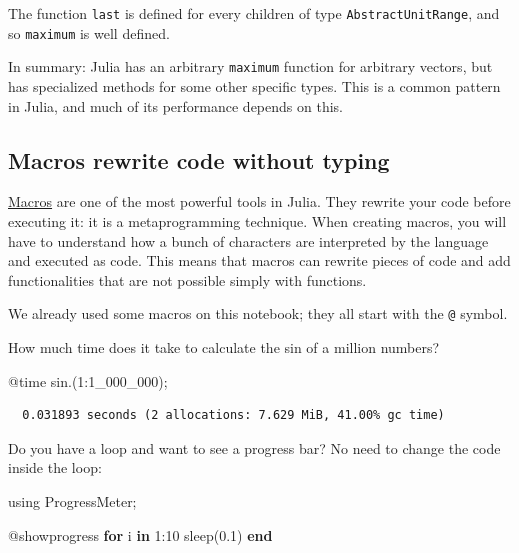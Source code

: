 \documentclass[
  letterpaper,
  DIV=11,
  numbers=noendperiod]{scrartcl}
\newenvironment{Shaded}{\begin{snugshade}}{\end{snugshade}}
\newcommand{\BuiltInTok}[1]{\textcolor[rgb]{0.00,0.23,0.31}{#1}}
\newcommand{\ControlFlowTok}[1]{\textcolor[rgb]{0.00,0.23,0.31}{\textbf{#1}}}
\newcommand{\FloatTok}[1]{\textcolor[rgb]{0.68,0.00,0.00}{#1}}
\newcommand{\FunctionTok}[1]{\textcolor[rgb]{0.28,0.35,0.67}{#1}}
\newcommand{\ImportTok}[1]{\textcolor[rgb]{0.00,0.46,0.62}{#1}}
\newcommand{\KeywordTok}[1]{\textcolor[rgb]{0.00,0.23,0.31}{\textbf{#1}}}
\newcommand{\NormalTok}[1]{\textcolor[rgb]{0.00,0.23,0.31}{#1}}
\newcommand{\OperatorTok}[1]{\textcolor[rgb]{0.37,0.37,0.37}{#1}}
\newcommand{\PreprocessorTok}[1]{\textcolor[rgb]{0.68,0.00,0.00}{#1}}
\begin{document}
The function \texttt{last} is defined for every children of type
\texttt{AbstractUnitRange}, and so \texttt{maximum} is well defined.

In summary: Julia has an arbitrary \texttt{maximum} function for
arbitrary vectors, but has specialized methods for some other specific
types. This is a common pattern in Julia, and much of its performance
depends on this.

\subsection{Macros rewrite code without
typing}\label{macros-rewrite-code-without-typing}

\href{https://docs.julialang.org/en/v1/manual/metaprogramming/}{Macros}
are one of the most powerful tools in Julia. They rewrite your code
before executing it: it is a metaprogramming technique. When creating
macros, you will have to understand how a bunch of characters are
interpreted by the language and executed as code. This means that macros
can rewrite pieces of code and add functionalities that are not possible
simply with functions.

We already used some macros on this notebook; they all start with the
\texttt{@} symbol.

How much time does it take to calculate the sin of a million numbers?

\begin{Shaded}
\begin{Highlighting}[]
\PreprocessorTok{@time} \FunctionTok{sin}\NormalTok{.(}\FloatTok{1}\OperatorTok{:}\FloatTok{1\_000\_000}\NormalTok{);}
\end{Highlighting}
\end{Shaded}

\begin{verbatim}
  0.031893 seconds (2 allocations: 7.629 MiB, 41.00% gc time)
\end{verbatim}

Do you have a loop and want to see a progress bar? No need to change the
code inside the loop:

\begin{Shaded}
\begin{Highlighting}[]
\ImportTok{using} \BuiltInTok{ProgressMeter;}

\PreprocessorTok{@showprogress} \ControlFlowTok{for}\NormalTok{ i }\KeywordTok{in} \FloatTok{1}\OperatorTok{:}\FloatTok{10}
    \FunctionTok{sleep}\NormalTok{(}\FloatTok{0.1}\NormalTok{)}
\ControlFlowTok{end}
\end{Highlighting}
\end{Shaded}
\end{document}
